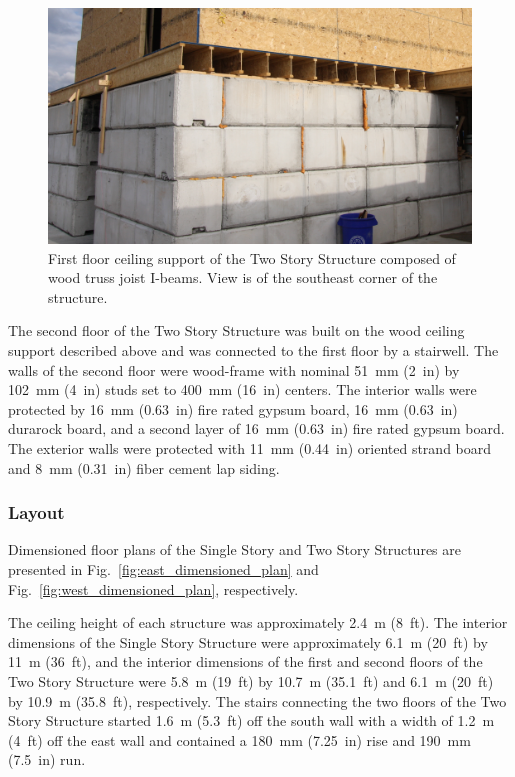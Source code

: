 \documentclass[12pt,oneside]{book}
\begin{document}
\begin{figure}[!ht]
	\includegraphics[width=\columnwidth]{../Figures/Pictures/TJI_support}
	\caption[TJI-constructed ceiling support of the Two Story Structure.]{First floor ceiling support of the Two Story Structure composed of wood truss joist I-beams. View is of the southeast corner of the structure.}
	\label{fig:TJI}
\end{figure}
\FloatBarrier

The second floor of the Two Story Structure was built on the wood ceiling support described above and was connected to the first floor by a stairwell. The walls of the second floor were wood-frame with nominal 51~mm (2~in) by 102~mm (4~in) studs set to 400~mm (16~in) centers. The interior walls were protected by 16~mm (0.63~in) fire rated gypsum board, 16~mm (0.63~in) durarock board, and a second layer of 16~mm (0.63~in) fire rated gypsum board. The exterior walls were protected with 11~mm (0.44~in) oriented strand board and 8~mm (0.31~in) fiber cement lap siding.

\subsubsection{Layout}
\label{sec:layout}
Dimensioned floor plans of the Single Story and Two Story Structures are presented in Fig.~\ref{fig:east_dimensioned_plan} and Fig.~\ref{fig:west_dimensioned_plan}, respectively.

The ceiling height of each structure was approximately 2.4~m (8~ft). The interior dimensions of the Single Story Structure were approximately 6.1~m (20~ft) by 11~m (36~ft), and the interior dimensions of the first and second floors of the Two Story Structure were 5.8~m (19~ft) by 10.7~m (35.1~ft) and 6.1~m (20~ft) by 10.9~m (35.8~ft), respectively. The stairs connecting the two floors of the Two Story Structure started 1.6~m (5.3~ft) off the south wall with a width of 1.2~m (4~ft) off the east wall and contained a 180~mm (7.25~in) rise and 190~mm (7.5~in) run.
\end{document}
